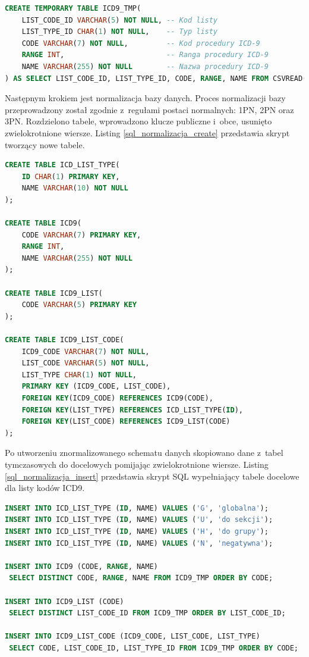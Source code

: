 \begin{lstlisting}[language=SQL,caption={Import listy kodów ICD9 z~pliku CSV.},label=sql_import_csv]
CREATE TEMPORARY TABLE ICD9_TMP(
    LIST_CODE_ID VARCHAR(5) NOT NULL, -- Kod listy
    LIST_TYPE_ID CHAR(1) NOT NULL,    -- Typ listy
    CODE VARCHAR(7) NOT NULL,         -- Kod procedury ICD-9
    RANGE INT,                        -- Ranga procedury ICD-9
    NAME VARCHAR(255) NOT NULL        -- Nazwa procedury ICD-9
) AS SELECT LIST_CODE_ID, LIST_TYPE_ID, CODE, RANGE, NAME FROM CSVREAD('icd9.csv');
\end{lstlisting}

Następnym krokiem jest normalizacja bazy danych. Proces normalizacji bazy przeprowadzony został zgodnie z~regułami postaci normalnych: 1PN, 2PN oraz 3PN\cite{bazy_mimuw}. Rozdzielono tabele, wprowadzono klucze publiczne i~obce, usunięto zwielokrotnione wiersze. Listing \ref{sql_normalizacja_create} przedstawia skrypt tworzący nowe tabele.
\newpage
\begin{lstlisting}[language=SQL,caption={Normalizacja - tworzenie tabel dla listy kodów ICD9.},label=sql_normalizacja_create]
CREATE TABLE ICD_LIST_TYPE(
    ID CHAR(1) PRIMARY KEY,
    NAME VARCHAR(10) NOT NULL
);

CREATE TABLE ICD9(
    CODE VARCHAR(7) PRIMARY KEY,
    RANGE INT,
    NAME VARCHAR(255) NOT NULL
);

CREATE TABLE ICD9_LIST(
    CODE VARCHAR(5) PRIMARY KEY
);

CREATE TABLE ICD9_LIST_CODE(
    ICD9_CODE VARCHAR(7) NOT NULL,
    LIST_CODE VARCHAR(5) NOT NULL,
    LIST_TYPE CHAR(1) NOT NULL,
    PRIMARY KEY (ICD9_CODE, LIST_CODE),
    FOREIGN KEY(ICD9_CODE) REFERENCES ICD9(CODE),
    FOREIGN KEY(LIST_TYPE) REFERENCES ICD_LIST_TYPE(ID),
    FOREIGN KEY(LIST_CODE) REFERENCES ICD9_LIST(CODE)
);
\end{lstlisting}

Po utworzeniu znormalizowanego schematu danych skopiowano dane z~tabel tymczasowych do docelowych pomijając zwielokrotnione wiersze. Listing \ref{sql_normalizacja_insert} przedstawia skrypt SQL wypełniający tabele docelowe dla listy kodów ICD9.

\begin{lstlisting}[language=SQL,caption={Normalizacja - wypełnianie tabel danymi dla listy kodów ICD9.},label=sql_normalizacja_insert]
INSERT INTO ICD_LIST_TYPE (ID, NAME) VALUES ('G', 'globalna');
INSERT INTO ICD_LIST_TYPE (ID, NAME) VALUES ('U', 'do sekcji');
INSERT INTO ICD_LIST_TYPE (ID, NAME) VALUES ('H', 'do grupy');
INSERT INTO ICD_LIST_TYPE (ID, NAME) VALUES ('N', 'negatywna');

INSERT INTO ICD9 (CODE, RANGE, NAME)
 SELECT DISTINCT CODE, RANGE, NAME FROM ICD9_TMP ORDER BY CODE;

INSERT INTO ICD9_LIST (CODE)
 SELECT DISTINCT LIST_CODE_ID FROM ICD9_TMP ORDER BY LIST_CODE_ID;

INSERT INTO ICD9_LIST_CODE (ICD9_CODE, LIST_CODE, LIST_TYPE)
 SELECT CODE, LIST_CODE_ID, LIST_TYPE_ID FROM ICD9_TMP ORDER BY CODE;
\end{lstlisting}

